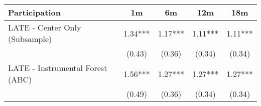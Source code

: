 \begin{tabular}{lcccc}
\toprule 
\midrule 
Participation & 1m & 6m & 12m & 18m \\
\midrule 
LATE - Center Only (Subsample) & 1.34*** & 1.17*** & 1.11*** & 1.11*** \\
 & (0.43) & (0.36) & (0.34) & (0.34) \\
LATE - Instrumental Forest (ABC) & 1.56*** & 1.27*** & 1.27*** & 1.27*** \\
 & (0.49) & (0.36) & (0.34) & (0.34) \\
\midrule 
\bottomrule 
\end{tabular}
